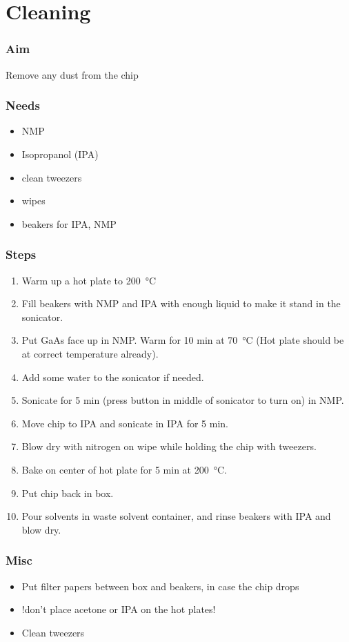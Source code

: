 \section{Cleaning}

\subsubsection{Aim}
Remove any dust from the chip

\subsubsection{Needs}
\begin{itemize} [noitemsep]
\item NMP
\item Isopropanol (IPA)
\item clean tweezers
\item wipes
\item beakers for IPA, NMP
\end{itemize}

\subsubsection{Steps}
\begin{enumerate}
\item Warm up a hot plate to \SI{200}{\celsius}
\item Fill beakers with NMP and IPA with enough liquid to make it stand in the sonicator.
\item Put GaAs face up in NMP. Warm for 10 min at \SI{70}{\celsius} (Hot plate should be at correct temperature already).
\item Add some water to the sonicator if needed.
\item Sonicate for 5 min (press button in middle of sonicator to turn on) in NMP.
\item Move chip to IPA and sonicate in IPA for 5 min.
\item Blow dry with nitrogen on wipe while holding the chip with tweezers.
\item Bake on center of hot plate for 5 min at \SI{200}{\celsius}.
\item Put chip back in box.
\item Pour solvents in waste solvent container, and rinse beakers with IPA and blow dry.
\end{enumerate}

\subsubsection{Misc}
\begin{itemize}
\item Put filter papers between box and beakers, in case the chip drops
\item !don't place acetone or IPA on the hot plates!
\item Clean tweezers
\end{itemize}

\newpage

